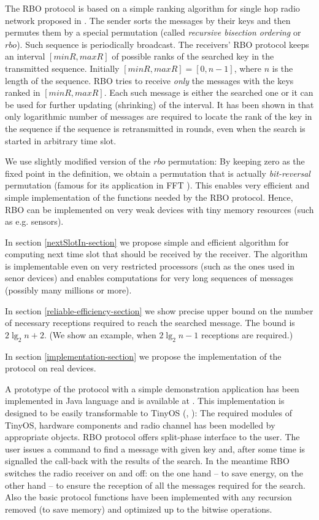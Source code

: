 \documentclass{llncs}
\begin{document}
The RBO protocol is based on a simple ranking algorithm
for single hop radio network proposed in \cite{DBLP:conf/adhoc-now/Kik08}.
The sender sorts the messages by their keys and then permutes them by a special permutation
(called {\em recursive bisection ordering} or {\em $rbo$}).
Such sequence is periodically broadcast.
The receivers' RBO protocol 
keeps an interval $[minR, maxR]$ of possible ranks of the searched key 
in the transmitted sequence.
Initially $[minR, maxR]=[0, n-1]$, where $n$ is the length of the sequence.
RBO tries to receive {\em only} the messages with the keys ranked in $[minR, maxR]$.
Each such message is either the searched one
or it can be used for further updating (shrinking) of the interval.
It has been shown in \cite{DBLP:conf/adhoc-now/Kik08} that 
only logarithmic number of messages are required to locate the rank of the
key in the sequence if the sequence is retransmitted in rounds,
even when the search is started in arbitrary time slot.

We use slightly modified version of the $rbo$ permutation:
By keeping zero as the fixed point in the definition, we
obtain a permutation that is actually {\em bit-reversal} permutation
(famous for its application in FFT \cite{CormenLR89}).
This enables very efficient and simple implementation
of the functions needed by the RBO protocol.
Hence, RBO can be implemented on very weak devices with tiny memory
resources (such as e.g. sensors).

In section \ref{nextSlotIn-section} we propose simple and efficient 
 algorithm
for computing next time slot that should be received by the receiver.
The algorithm is implementable even on very restricted processors
(such as the ones used in senor devices) and enables 
computations for very long sequences of messages (possibly many millions or more).

In section \ref{reliable-efficiency-section}
we show precise upper bound on
the number of necessary receptions required 
to reach the searched message.
The bound is $2\lg_2 n+2$.
(We show an example, when $2\lg_2 n-1$ receptions are required.)

In section \ref{implementation-section}
we propose the implementation of the protocol on real devices.

A prototype of the protocol with a simple demonstration application 
has been implemented in Java language
and is available at \cite{RBO-WWW}.
This implementation is designed to be 
easily transformable to TinyOS (\cite{TinyOSProgramming}, \cite{TinyOS-WWW}):
The required modules of TinyOS, hardware components and radio channel
has been modelled by appropriate objects.
RBO protocol offers split-phase interface to the user.
The user issues a command to find a message with given key and,
after some time is signalled the call-back with the results
of the search.
In the meantime RBO switches the radio receiver on and off:
on the one hand -- to save energy, on the other hand -- 
to ensure the reception of all the messages required for the search.
Also the basic protocol functions have been implemented with any recursion
removed (to save memory) and optimized up to the bitwise operations. 
 
\end{document}
